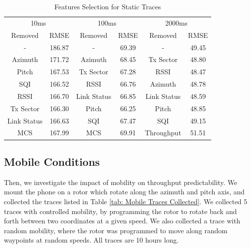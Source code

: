 \documentclass[sigconf,anonymous]{acmart}
\begin{document}
\begin{table}[h]
\caption{Features Selection for Static Traces}
\label{tab: Static Feature Selection}
\begin{tabular}{c c|c c|c c}
\toprule
\multicolumn{2}{c|}{10ms} & \multicolumn{2}{c|}{100ms} & \multicolumn{2}{c}{2000ms} \\
Removed & RMSE & Removed & RMSE & Removed & RMSE \\
\midrule
- & 186.87 & - & 69.39 & - & 49.45 \\
Azimuth & 171.72 & Azimuth & 68.45 & Tx Sector & 48.80 \\
Pitch & 167.53 & Tx Sector & 67.28 & RSSI & 48.47 \\
SQI & 166.52 & RSSI & 66.76 & Azimuth & 48.78 \\
RSSI & 166.70 & Link Status & 66.85 & Link Status & 48.59 \\
Tx Sector & 166.30 & Pitch & 66.25 & Pitch & 48.85 \\
Link Status & 166.63 & SQI & 67.47 & SQI & 49.15 \\
MCS & 167.99 & MCS & 69.91 & Throughput & 51.51 \\
\bottomrule
\end{tabular}
\end{table}


\subsection{Mobile Conditions}

Then, we investigate the impact of mobility on throughput predictability. We mount the phone on a rotor which rotate along the azimuth and pitch axis, and collected the traces listed in Table \ref{tab: Mobile Traces Collected}. We collected 5 traces with controlled mobility, by programming the rotor to rotate back and forth between two coordinates at a given speed. We also collected a trace with random mobility, where the rotor was programmed to move along random waypoints at random speeds. All traces are 10 hours long.
\end{document}
